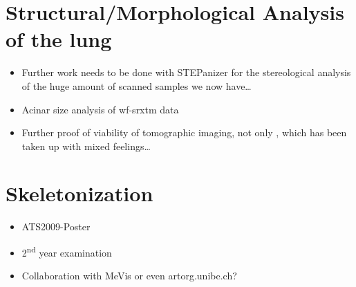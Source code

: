 \section{Structural/Morphological Analysis of the lung}
\begin{itemize}
	\item Further work needs to be done with STEPanizer for the stereological analysis of the huge amount of scanned samples we now have\ldots
	\item Acinar size analysis of \ac{wf-srxtm} data
	\item Further proof of viability of tomographic imaging, not only \cite{Tsuda2008}, which has been taken up with mixed feelings\ldots
\end{itemize}

\section{Skeletonization}
\begin{itemize}
	\item ATS2009-Poster
	\item 2\textsuperscript{nd} year examination
	\item Collaboration with MeVis or even artorg.unibe.ch?
\end{itemize}

